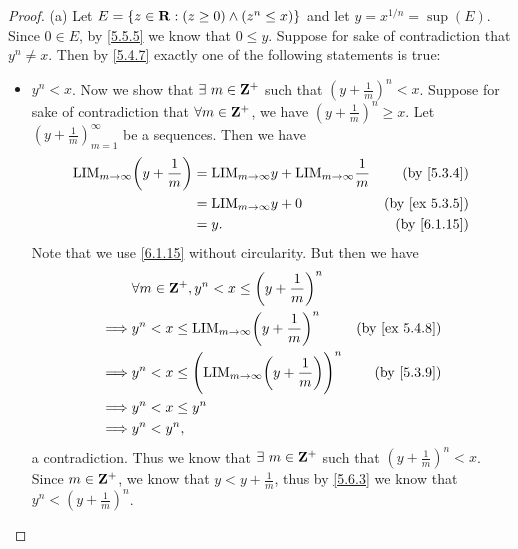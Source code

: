 \begin{proof}{(a)}
  Let \(E = \{z \in \mathbf{R} : (z \geq 0) \land (z^n \leq x)\}\) and let \(y = x^{1 / n} = \sup(E)\).
  Since \(0 \in E\), by \cref{5.5.5} we know that \(0 \leq y\).
  Suppose for sake of contradiction that \(y^n \neq x\).
  Then by \cref{5.4.7} exactly one of the following statements is true:
  \begin{itemize}
    \item \(y^n < x\).
          Now we show that \(\exists\ m \in \mathbf{Z}^+\) such that \((y + \frac{1}{m})^n < x\).
          Suppose for sake of contradiction that \(\forall m \in \mathbf{Z}^+\), we have \((y + \frac{1}{m})^n \geq x\).
          Let \((y + \frac{1}{m})_{m = 1}^\infty\) be a sequences.
          Then we have
          \begin{align*}
            \text{LIM}_{m \to \infty} \bigg(y + \frac{1}{m}\bigg) & = \text{LIM}_{m \to \infty} y + \text{LIM}_{m \to \infty} \frac{1}{m} & \text{(by \cref{5.3.4})}    \\
                                                                  & = \text{LIM}_{m \to \infty} y + 0                                     & \text{(by \cref{ex 5.3.5})} \\
                                                                  & = y.                                                                  & \text{(by \cref{6.1.15})}
          \end{align*}
          Note that we use \cref{6.1.15} without circularity.
          But then we have
          \begin{align*}
                     & \forall m \in \Z^+, y^n < x \leq \bigg(y + \frac{1}{m}\bigg)^n                                                 \\
            \implies & y^n < x \leq \text{LIM}_{m \to \infty} \bigg(y + \frac{1}{m}\bigg)^n             & \text{(by \cref{ex 5.4.8})} \\
            \implies & y^n < x \leq \Bigg(\text{LIM}_{m \to \infty} \bigg(y + \frac{1}{m}\bigg)\Bigg)^n & \text{(by \cref{5.3.9})}    \\
            \implies & y^n < x \leq y^n                                                                                               \\
            \implies & y^n < y^n,
          \end{align*}
          a contradiction.
          Thus we know that \(\exists\ m \in \mathbf{Z}^+\) such that \((y + \frac{1}{m})^n < x\).
          Since \(m \in \mathbf{Z}^+\), we know that \(y < y + \frac{1}{m}\), thus by \cref{5.6.3} we know that \(y^n < (y + \frac{1}{m})^n\).

\end{itemize}
\end{proof}
